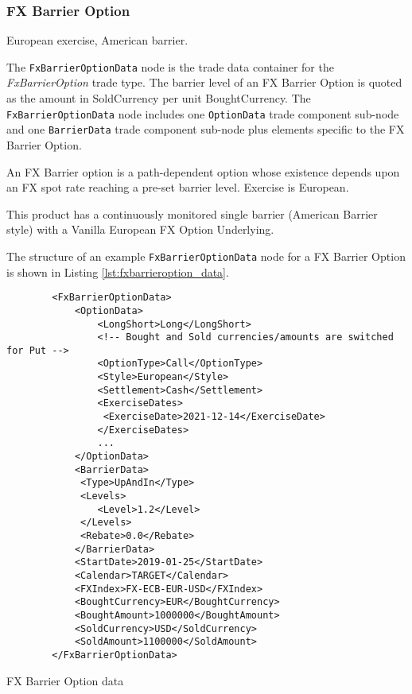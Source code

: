 \subsubsection{FX Barrier Option}

European exercise, American barrier.

The \lstinline!FxBarrierOptionData!  node is the trade data container for the \emph{FxBarrierOption} trade type.   The barrier level of an FX Barrier Option is quoted as the amount in SoldCurrency
per unit BoughtCurrency. The \lstinline!FxBarrierOptionData!  node includes one  \lstinline!OptionData! trade component sub-node and one \lstinline!BarrierData! trade component sub-node plus elements
specific to the FX Barrier Option. 

An FX Barrier option is a path-dependent option whose existence depends upon an FX
spot rate reaching a pre-set barrier level. Exercise is European.

This product has a continuously monitored single barrier (American Barrier style) with a Vanilla European FX
Option Underlying.

The structure of an example \lstinline!FxBarrierOptionData! node for a FX Barrier Option is shown in Listing
\ref{lst:fxbarrieroption_data}.

\begin{listing}[H]
\begin{verbatim}
        <FxBarrierOptionData>
            <OptionData>
                <LongShort>Long</LongShort>
                <!-- Bought and Sold currencies/amounts are switched for Put -->
                <OptionType>Call</OptionType>
                <Style>European</Style>
                <Settlement>Cash</Settlement>                
                <ExerciseDates>
                 <ExerciseDate>2021-12-14</ExerciseDate>
                </ExerciseDates>
                ...
            </OptionData>
            <BarrierData>
             <Type>UpAndIn</Type>
             <Levels>
                <Level>1.2</Level>
             </Levels>
             <Rebate>0.0</Rebate>    
            </BarrierData>
            <StartDate>2019-01-25</StartDate>
            <Calendar>TARGET</Calendar>            
            <FXIndex>FX-ECB-EUR-USD</FXIndex>
            <BoughtCurrency>EUR</BoughtCurrency>
            <BoughtAmount>1000000</BoughtAmount>
            <SoldCurrency>USD</SoldCurrency>
            <SoldAmount>1100000</SoldAmount>
        </FxBarrierOptionData>
\end{verbatim}
\caption{FX Barrier Option data}
\label{lst:fxbarrieroption_data}
\end{listing}

